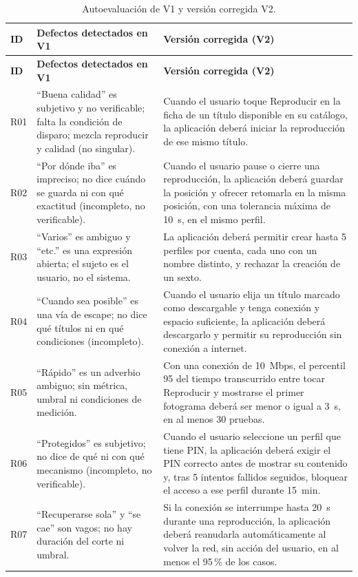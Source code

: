 \documentclass[11pt,a4paper]{article}
\begin{document}
\begingroup\small
\begin{longtable}{@{}p{0.9cm}p{4.9cm}p{9.4cm}@{}}
\caption{Autoevaluaci\'on de V1 y versi\'on corregida V2.}\label{tab:auto}\\
\toprule
\textbf{ID} & \textbf{Defectos detectados en V1} & \textbf{Versi\'on corregida (V2)}\\
\midrule\endfirsthead
\toprule
\textbf{ID} & \textbf{Defectos detectados en V1} & \textbf{Versi\'on corregida (V2)}\\
\midrule\endhead
R01 & ``Buena calidad'' es subjetivo y no verificable; falta la condici\'on de disparo; mezcla reproducir y calidad (no singular). & Cuando el usuario toque Reproducir en la ficha de un t\'itulo disponible en su cat\'alogo, la aplicaci\'on deber\'a iniciar la reproducci\'on de ese mismo t\'itulo.\\
R02 & ``Por d\'onde iba'' es impreciso; no dice cu\'ando se guarda ni con qu\'e exactitud (incompleto, no verificable). & Cuando el usuario pause o cierre una reproducci\'on, la aplicaci\'on deber\'a guardar la posici\'on y ofrecer retomarla en la misma posici\'on, con una tolerancia m\'axima de 10~s, en el mismo perfil.\\
R03 & ``Varios'' es ambiguo y ``etc.'' es una expresi\'on abierta; el sujeto es el usuario, no el sistema. & La aplicaci\'on deber\'a permitir crear hasta 5 perfiles por cuenta, cada uno con un nombre distinto, y rechazar la creaci\'on de un sexto.\\
R04 & ``Cuando sea posible'' es una v\'ia de escape; no dice qu\'e t\'itulos ni en qu\'e condiciones (incompleto). & Cuando el usuario elija un t\'itulo marcado como descargable y tenga conexi\'on y espacio suficiente, la aplicaci\'on deber\'a descargarlo y permitir su reproducci\'on sin conexi\'on a internet.\\
R05 & ``R\'apido'' es un adverbio ambiguo; sin m\'etrica, umbral ni condiciones de medici\'on. & Con una conexi\'on de 10~Mbps, el percentil 95 del tiempo transcurrido entre tocar Reproducir y mostrarse el primer fotograma deber\'a ser menor o igual a 3~s, en al menos 30 pruebas.\\
R06 & ``Protegidos'' es subjetivo; no dice de qu\'e ni con qu\'e mecanismo (incompleto, no verificable). & Cuando el usuario seleccione un perfil que tiene PIN, la aplicaci\'on deber\'a exigir el PIN correcto antes de mostrar su contenido y, tras 5 intentos fallidos seguidos, bloquear el acceso a ese perfil durante 15~min.\\
R07 & ``Recuperarse sola'' y ``se cae'' son vagos; no hay duraci\'on del corte ni umbral. & Si la conexi\'on se interrumpe hasta 20~s durante una reproducci\'on, la aplicaci\'on deber\'a reanudarla autom\'aticamente al volver la red, sin acci\'on del usuario, en al menos el 95\,\% de los casos.\\

\end{longtable}
\end{document}

